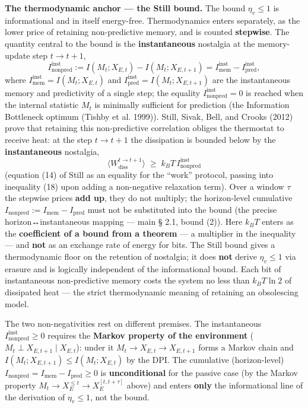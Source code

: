 \documentclass[pdflatex,sn-mathphys-ay]{sn-jnl}
\begin{document}
\textbf{The thermodynamic anchor --- the Still bound.} The bound \(\eta_v \le 1\) is informational and in itself energy-free. Thermodynamics enters separately, as the lower price of retaining non-predictive memory, and is counted \textbf{stepwise}. The quantity central to the bound is the \textbf{instantaneous} nostalgia at the memory-update step \(t \to t+1\), \[I_{\text{nonpred}}^{\text{inst}} := I(M_t; X_{E,t}) - I(M_t; X_{E,t+1}) = I_{\text{mem}}^{\text{inst}} - I_{\text{pred}}^{\text{inst}},\] where \(I_{\text{mem}}^{\text{inst}} = I(M_t; X_{E,t})\) and \(I_{\text{pred}}^{\text{inst}} = I(M_t; X_{E,t+1})\) are the instantaneous memory and predictivity of a single step; the equality \(I_{\text{nonpred}}^{\text{inst}} = 0\) is reached when the internal statistic \(M_t\) is minimally sufficient for prediction (the Information Bottleneck optimum (Tishby et al. 1999)). Still, Sivak, Bell, and Crooks (2012) prove that retaining this non-predictive correlation obliges the thermostat to receive heat: at the step \(t \to t+1\) the dissipation is bounded below by the \textbf{instantaneous} nostalgia, \[\langle W_{\text{diss}}^{t\to t+1}\rangle \;\ge\; k_B T \, I_{\text{nonpred}}^{\text{inst}}\] (equation (14) of Still as an equality for the ``work'' protocol, passing into inequality (18) upon adding a non-negative relaxation term). Over a window \(\tau\) the stepwise prices \textbf{add up}, they do not multiply; the horizon-level cumulative \(I_{\text{nonpred}} := I_{\text{mem}} - I_{\text{pred}}\) must not be substituted into the bound (the precise horizon↔instantaneous mapping --- main § 2.1, bound (2)). Here \(k_B T\) enters as the \textbf{coefficient of a bound from a theorem} --- a multiplier in the inequality --- and \textbf{not} as an exchange rate of energy for bits. The Still bound gives a thermodynamic floor on the retention of nostalgia; it does \textbf{not} derive \(\eta_v \le 1\) via erasure and is logically independent of the informational bound. Each bit of instantaneous non-predictive memory costs the system no less than \(k_B T \ln 2\) of dissipated heat --- the strict thermodynamic meaning of retaining an obsolescing model.

The two non-negativities rest on different premises. The instantaneous \(I_{\text{nonpred}}^{\text{inst}} \ge 0\) requires the \textbf{Markov property of the environment} (\(M_t \perp X_{E,t+1} \mid X_{E,t}\)): under it \(M_t \to X_{E,t} \to X_{E,t+1}\) forms a Markov chain and \(I(M_t; X_{E,t+1}) \le I(M_t; X_{E,t})\) by the DPI. The cumulative (horizon-level) \(I_{\text{nonpred}} = I_{\text{mem}} - I_{\text{pred}} \ge 0\) is \textbf{unconditional} for the passive case (by the Markov property \(M_t \to X_E^{\le t} \to X_E^{[t, t+\tau]}\) above) and enters \textbf{only} the informational line of the derivation of \(\eta_v \le 1\), not the bound.
\end{document}
